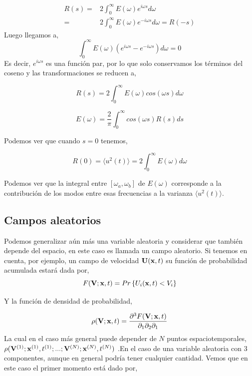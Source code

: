 \documentclass[executivepaper,12pt]{article}
\numberwithin{equation}{section}
\begin{document}
\begin{align*}
	R(s)=&2\int_{0}^\infty E(\omega)e^{i\omega s} d\omega\\ 
	=&2\int_{0}^\infty E(\omega)e^{-i\omega s} d\omega=R(-s)
\end{align*}
Luego llegamos a,
\begin{equation*}
	\int_{0}^\infty E(\omega)\left(e^{i\omega s}-e^{-i\omega s}\right) d\omega=0
\end{equation*}
Es decir, $e^{i\omega s}$ es una función par, por lo que solo conservamos los términos del coseno y las transformaciones se reducen a, 

\begin{equation*}
	R(s)=2\int_{0}^\infty E(\omega)cos(\omega s) d\omega
\end{equation*}

\begin{equation*}
	E(\omega)=\frac{2}{\pi}\int_{0}^{\infty} cos(\omega s) R(s) ds  
\end{equation*}

Podemos ver que cuando $s=0$ tenemos, 

\begin{equation*}
	R(0)=\langle u^2(t) \rangle =2 \int_{0}^{\infty} E(\omega) d\omega
\end{equation*}

Podemos ver que la integral entre $[\omega_a , \omega_b]$ de $E(\omega)$ corresponde a la contribución de los modos entre esas frecuencias a la varianza $\langle u^2 (t) \rangle$. 


\subsection{Campos aleatorios}

Podemos generalizar aún más una variable aleatoria y considerar que también depende del espacio, en este caso es llamada un campo aleatorio. Si tenemos en cuenta, por ejemplo, un campo de velocidad $\vb{U}(\vb{x},t)$ su función de probabilidad acumulada estará dada por,
\begin{equation*}
	F(\vb{V};\vb{x},t)=Pr\left\{U_i(\vb{x},t)<V_i\right\}
\end{equation*}

Y la función de densidad de probabilidad,

\begin{equation*}
	\rho(\vb{V};\vb{x},t)=\frac{\partial ^3 F(\vb{V};\vb{x},t)}{\partial_1 \partial_2 \partial_1}
\end{equation*}
La cual en el caso más general puede depender de $N$ puntos espaciotemporales, $\rho(\vb{V}^{(1)};\vb{x}^{(1)},t^{(1)};...;\vb{V}^{(N)};\vb{x}^{(N)},t^{(N)})$ .En el caso de una variable aleatoria con 3 componentes, aunque en general podría tener cualquier cantidad. Vemos que en este caso el primer momento está dado por,
\end{document}
